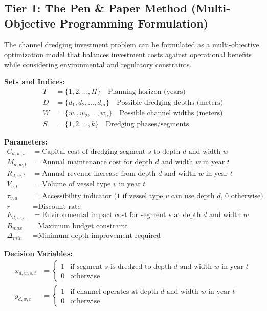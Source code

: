 \documentclass{article}
\begin{document}
\subsection{Tier 1: The Pen \& Paper Method (Multi-Objective Programming Formulation)}

The channel dredging investment problem can be formulated as a multi-objective optimization model that balances investment costs against operational benefits while considering environmental and regulatory constraints.

\textbf{Sets and Indices:}
\begin{align}
T &= \{1, 2, \ldots, H\} \quad \text{Planning horizon (years)} \\
D &= \{d_1, d_2, \ldots, d_m\} \quad \text{Possible dredging depths (meters)} \\
W &= \{w_1, w_2, \ldots, w_n\} \quad \text{Possible channel widths (meters)} \\
S &= \{1, 2, \ldots, k\} \quad \text{Dredging phases/segments}
\end{align}

\textbf{Parameters:}
\begin{align}
C_{d,w,s} &= \text{Capital cost of dredging segment } s \text{ to depth } d \text{ and width } w \\
M_{d,w,t} &= \text{Annual maintenance cost for depth } d \text{ and width } w \text{ in year } t \\
R_{d,w,t} &= \text{Annual revenue increase from depth } d \text{ and width } w \text{ in year } t \\
V_{v,t} &= \text{Volume of vessel type } v \text{ in year } t \\
\tau_{v,d} &= \text{Accessibility indicator (1 if vessel type } v \text{ can use depth } d\text{, 0 otherwise)} \\
r &= \text{Discount rate} \\
E_{d,w,s} &= \text{Environmental impact cost for segment } s \text{ at depth } d \text{ and width } w \\
B_{max} &= \text{Maximum budget constraint} \\
\Delta_{min} &= \text{Minimum depth improvement required}
\end{align}

\textbf{Decision Variables:}
\begin{align}
x_{d,w,s,t} &= \begin{cases} 1 & \text{if segment } s \text{ is dredged to depth } d \text{ and width } w \text{ in year } t \\ 0 & \text{otherwise} \end{cases} \\
y_{d,w,t} &= \begin{cases} 1 & \text{if channel operates at depth } d \text{ and width } w \text{ in year } t \\ 0 & \text{otherwise} \end{cases}
\end{align}
\end{document}
